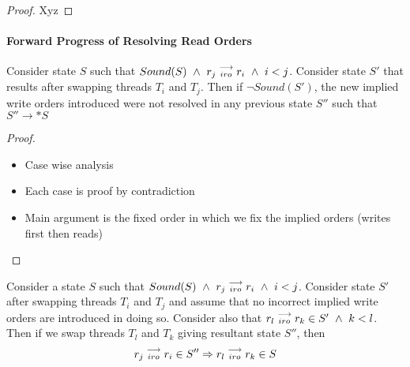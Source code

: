     \begin{proof}
        Xyz
    \end{proof}

    \paragraph{Forward Progress of Resolving Read Orders}



    \begin{lemma}
        \label{iwo-unres-iro}
        Consider state $S$ such that $Sound(S) \ \wedge \ \reln{r_j}{iro}{r_i} \ \wedge \ i < j$.
        Consider state $S'$ that results after swapping threads $T_i$ and $T_j$. 
        Then if $\neg Sound(S')$, the new implied write orders introduced were not resolved in any previous state $S''$ such that $S'' \to * S$ 
    
    \end{lemma}



    \begin{proof}
        \begin{itemize}
            \item Case wise analysis
            \item Each case is proof by contradiction
            \item Main argument is the fixed order in which we fix the implied orders (writes first then reads)
        \end{itemize}    
    \end{proof}

    \begin{lemma}
        \label{iro-stability}
        Consider a state $S$ such that $Sound(S) \ \wedge \ \reln{r_j}{iro}{r_i} \ \wedge \ i < j$.
        Consider state $S'$ after swapping threads $T_i$ and $T_j$ and assume that no incorrect implied write orders are introduced in doing so. 
        Consider also that $r_l\stackrel{\longrightarrow}{_{iro}}r_k \in S' \ \wedge \ k < l$.
        Then if we swap threads $T_l$ and $T_k$ giving resultant state $S''$, then 
        \begin{align*}
            r_j\stackrel{\longrightarrow}{_{iro}}r_i \in S'' 
            \Rightarrow
            r_l\stackrel{\longrightarrow}{_{iro}}r_k \in S
        \end{align*} 
    \end{lemma}

